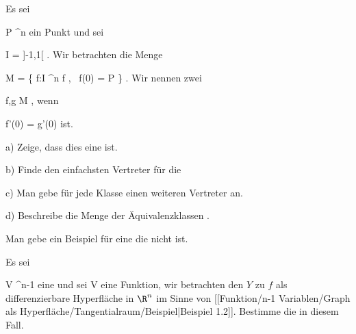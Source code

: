 {}
{

Es sei

\mavergleichskette
{\vergleichskette
{ P
}
{ \in }{ \R^n
}
{  }{
}
{    }{
}
{   }{
}
}
{}{}{}
ein Punkt und sei

\mavergleichskette
{\vergleichskette
{ I
}
{ = }{ {]{-1},1[}
}
{  }{
}
{    }{
}
{   }{
}
}
{}{}{.}
Wir betrachten die Menge

\mavergleichskettedisp
{\vergleichskette
{ M
}
{ =} { \left\{ f:I \rightarrow \R^n   \mid  f  , \,  f(0) = P       \right\}
}
{ } {
}
{ } {
}
{ } {
}
}
{}{}{.}
Wir nennen zwei

\mavergleichskette
{\vergleichskette
{ f,g
}
{ \in }{ M
}
{  }{
}
{    }{
}
{   }{
}
}
{}{}{}
 {,} wenn

\mavergleichskettedisp
{\vergleichskette
{ f'(0)
}
{ =} { g'(0)
}
{ } {
}
{ } {
}
{ } {
}
}
{}{}{}
ist.

a) Zeige, dass dies eine
ist.

b) Finde den einfachsten Vertreter für die

c) Man gebe für jede Klasse einen weiteren Vertreter an.

d) Beschreibe die Menge der Äquivalenzklassen
 {} {.}

}
{} {}

{}
{

Man gebe ein Beispiel für eine
 {} {}
die nicht
ist.

}
{} {}

{}
{

Es sei

\mavergleichskette
{\vergleichskette
{ V
}
{ \subseteq }{ \R^{n-1}
}
{  }{
}
{    }{
}
{   }{
}
}
{}{}{}
eine
und sei
 { V } {\R
} {}
eine
Funktion, wir betrachten den
$Y$ zu $f$ als differenzierbare Hyperfläche in $\R^n$ im Sinne von
[[Funktion/n-1 Variablen/Graph als Hyperfläche/Tangentialraum/Beispiel|Beispiel 1.2]].
Bestimme die
in diesem Fall.

}
{} {}


